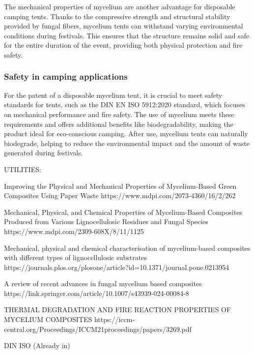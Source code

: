 The mechanical properties of mycelium are another advantage for disposable camping tents. Thanks to the
compressive strength and structural stability provided by fungal fibers, mycelium tents can withstand
varying environmental conditions during festivals. This ensures that the structure remains solid and safe
for the entire duration of the event, providing both physical protection and fire safety.


\subsubsection{Safety in camping applications}

For the patent of a disposable mycelium tent, it is crucial to meet safety standards for tents, such as
the DIN EN ISO 5912:2020 standard, which focuses on mechanical performance and fire safety. The use of
mycelium meets these requirements and offers additional benefits like biodegradability, making the product
ideal for eco-conscious camping. After use, mycelium tents can naturally biodegrade, helping to reduce the
environmental impact and the amount of waste generated during festivals.



UTILITIES:

Improving the Physical and Mechanical Properties of Mycelium-Based Green Composites Using Paper Waste
https://www.mdpi.com/2073-4360/16/2/262

Mechanical, Physical, and Chemical Properties of Mycelium-Based Composites Produced from Various Lignocellulosic Residues and Fungal Species
https://www.mdpi.com/2309-608X/8/11/1125

Mechanical, physical and chemical characterisation of mycelium-based composites with different types of lignocellulosic substrates
https://journals.plos.org/plosone/article?id=10.1371/journal.pone.0213954

A review of recent advances in fungal mycelium based composites
https://link.springer.com/article/10.1007/s43939-024-00084-8

THERMAL DEGRADATION AND FIRE REACTION PROPERTIES OF MYCELIUM COMPOSITES
https://iccm-central.org/Proceedings/ICCM21proceedings/papers/3269.pdf

DIN ISO (Already in)